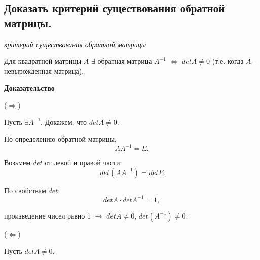 \ep

\subsection{Доказать критерий существования обратной матрицы.}

\textit{критерий существования обратной матрицы}

\vspace*{15pt}

Для квадратной матрицы $A$ $\exists$ обратная матрица $A^{-1}$ $\iff$ $detA \ne 0$ (т.е. когда $A$ - невырожденная матрица).

\vspace*{15pt}

{\bf {Доказательство}}

($\Rightarrow$)  

Пусть $\exists A^{-1}$. Докажем, что $detA \ne 0$.

По определению обратной матрицы, 
$$AA^{-1} = E.$$

Возьмем $det$ от левой и правой части:
$$det(AA^{-1}) = detE$$

По свойствам $det$:
$$detA\cdot detA^{-1} = 1,$$

произведение чисел равно 1 $\rightarrow$ $detA \ne 0$, $det(A^{-1}) \ne 0$.

\vspace*{15pt}

($\Leftarrow$)

Пусть $detA \ne 0$.

